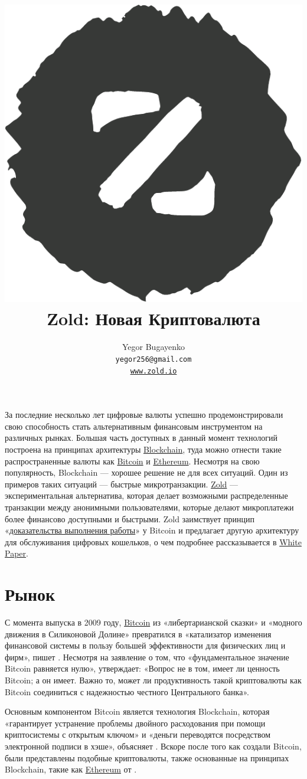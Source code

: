 \documentclass[12pt,oneside]{article}
\title{\includegraphics[scale=0.3]{../images/logo.pdf}\\
  Zold: Новая Криптовалюта\\
  {\small\colorbox{dgreen}{\color{lgreen}{Green Paper}}}}
\author{Yegor Bugayenko\\
  \texttt{yegor256@gmail.com}\\
  \href{https://www.zold.io}{\texttt{www.zold.io}}\\[1em]
  \href{https://github.com/zold-io/papers/releases/tag/\zoldversion}{\texttt{\zoldversion}}}
\begin{document}
\raggedbottom

\maketitle

За последние несколько лет цифровые валюты успешно продемонстрировали свою
способность стать альтернативным финансовым инструментом на различных рынках.
Большая часть доступных в данный момент технологий построена на принципах
архитектуры \href{https://en.wikipedia.org/wiki/Blockchain}{Blockchain},
туда можно отнести такие распространенные валюты как
\href{https://bitcoin.org/}{Bitcoin} и \href{https://ethereum.org/}{Ethereum}.
Несмотря на свою популярность, Blockchain --- хорошее решение
не для всех ситуаций. Один из примеров таких ситуаций --- быстрые микротранзакции.
\href{https://www.zold.io}{Zold} --- экспериментальная альтернатива, которая делает возможными распределенные
транзакции между анонимными пользователями, которые делают микроплатежи более
финансово доступными и быстрыми. Zold заимствует принцип
«\href{https://ru.wikipedia.org/wiki/%D0%94%D0%BE%D0%BA%D0%B0%D0%B7%D0%B0%D1%82%D0%B5%D0%BB%D1%8C%D1%81%D1%82%D0%B2%D0%BE_%D0%B2%D1%8B%D0%BF%D0%BE%D0%BB%D0%BD%D0%B5%D0%BD%D0%B8%D1%8F_%D1%80%D0%B0%D0%B1%D0%BE%D1%82%D1%8B}{доказательства выполнения работы}»
у Bitcoin и предлагает другую архитектуру для обслуживания
цифровых кошельков, о чем подробнее рассказывается в
\href{https://papers.zold.io}{White Paper}.

\pagebreak

\section*{Рынок}

С момента выпуска в 2009 году, \href{https://bitcoin.org/}{Bitcoin} из «либертарианской сказки»
и «модного движения в Силиконовой Долине» превратился в «катализатор изменения финансовой
системы в пользу большей эффективности для физических лиц и фирм», пишет
. Несмотря на заявление  о том, что «фундаментальное значение
Bitcoin равняется нулю»,  утверждает: «Вопрос не в том, имеет ли
ценность Bitcoin; а он имеет. Важно то, может ли продуктивность такой
криптовалюты как Bitcoin соединиться с надежностью честного Центрального банка».

Основным компонентом Bitcoin является технология Blockchain, которая
«гарантирует устранение проблемы двойного расходования при помощи криптосистемы
с открытым ключом» и «деньги переводятся посредством электронной подписи в
хэше», объясняет . Вскоре после того как создали Bitcoin, были
представлены подобные криптовалюты, также основанные на принципах Blockchain,
такие как \href{https://ethereum.org/}{Ethereum} от .
\end{document}
